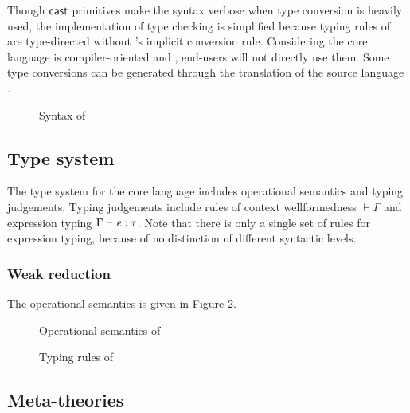 Though $\mathsf{cast}$ primitives make the syntax verbose when type conversion is heavily used, the implementation of type checking is simplified because typing rules of \name are type-directed without \cc's implicit conversion rule. Considering the core language is compiler-oriented and , end-users will not directly use them. Some type conversions can be generated through the translation of the source language \fixme{(\S \ref{sec:src})}.

\begin{figure}
    \gram{\otte\ottinterrule
        \ottG\ottinterrule
        \ottv}
    \caption{Syntax of \name}
    \label{fig:core:syntax}
\end{figure}

\subsection{Type system}\label{sec:core:type}
The type system for the core language includes operational semantics and typing judgements. Typing judgements include rules of context wellformedness $\vdash  \Gamma$ and expression typing $\Gamma  \vdash  \mathit{e}  :  \tau$. Note that there is only a single set of rules for expression typing, because of no distinction of different syntactic levels.

\subsubsection{Weak reduction}
The operational semantics is given in Figure \ref{fig:core:opsem}. 

\begin{figure}
    \ottdefnstep{}
    \caption{Operational semantics of \name}
    \label{fig:core:opsem}
\end{figure}

\begin{figure}
    \ottdefnctx{}
    \ottdefnexpr{}
    \caption{Typing rules of \name}
    \label{fig:core:typing}
\end{figure}

\subsection{Meta-theories}\label{sec:core:meta}
